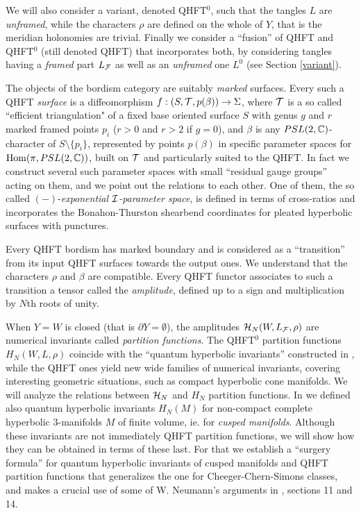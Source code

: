 We will also consider a variant, denoted QHFT$^0$, such that the
tangles $L$ are {\it unframed}, while the characters $\rho$ are
defined on the whole of $Y$, that is the meridian holonomies are
trivial. Finally we consider a ``fusion'' of QHFT and QHFT$^0$
(still denoted QHFT) that incorporates both, by considering tangles
having a {\it framed} part $L_{\mathcal F}$ as well as an {\it unframed} one
$L^0$ (see Section \ref{variant}).

The objects of the bordism category are suitably {\it marked}
surfaces. Every such a  QHFT {\it surface} is a diffeomorphism $f:
(S,{\mathcal T},p(\beta)) \to \Sigma$, where ${\mathcal T}$ is a so called
``efficient triangulation" of a fixed base oriented surface $S$
with genus $g$ and $r$ marked framed points $p_i$ ($r>0$ and $r>2$
if $g=0$), and $\beta$ is any $PSL(2,{\mathbb C})$-character of $S\setminus
\{p_i\}$, represented by points $p(\beta)$ in specific parameter
spaces for ${\rm Hom}(\pi,PSL(2,{\mathbb C}))$, built on ${\mathcal T}$ and
particularly suited to the QHFT. In fact we construct several such
parameter spaces with small ``residual gauge groups'' acting on
them, and we point out the relations to each other. One of them,
the so called $(-)$-{\it exponential ${\mathcal I}$-parameter space}, is
defined in terms of cross-ratios and incorporates the
Bonahon-Thurston shearbend coordinates for pleated hyperbolic
surfaces with punctures.

Every QHFT bordism has marked boundary and is considered as a
``transition'' from its input QHFT surfaces towards the output
ones. We understand that the characters $\rho$ and $\beta$ are
compatible. Every QHFT functor associates to such a transition a
tensor called the {\it amplitude}, defined up to a sign and
multiplication by $N$th roots of unity.
\smallskip

When $Y=W$ is closed (that is $\partial Y = \emptyset$), the
amplitudes ${\mathcal H}_N(W,L_{\mathcal F}, \rho)$ are numerical invariants called {\it
  partition functions}. The QHFT$^0$ partition functions
$H_N(W,L,\rho)$ coincide with the ``quantum hyperbolic invariants''
constructed in \cite{BB1, BB2}, while the QHFT ones yield new wide
families of numerical invariants, covering interesting geometric
situations, such as compact hyperbolic cone manifolds. We will analyze
the relations between ${\mathcal H}_N$ and $H_N$ partition functions.  In
\cite{BB2} we defined also quantum hyperbolic invariants $H_N(M)$ for
non-compact complete hyperbolic 3-manifolds $M$ of finite volume,
ie. for {\it cusped manifolds}. Although these invariants are not
immediately QHFT partition functions, we will show how they can be
obtained in terms of these last. For that we establish a ``surgery
formula'' for quantum hyperbolic invariants of cusped manifolds and
QHFT partition functions that generalizes the one for
Cheeger-Chern-Simons classes, and makes a crucial use of some of
W. Neumann's arguments in \cite{N}, sections 11 and 14.
\smallskip

